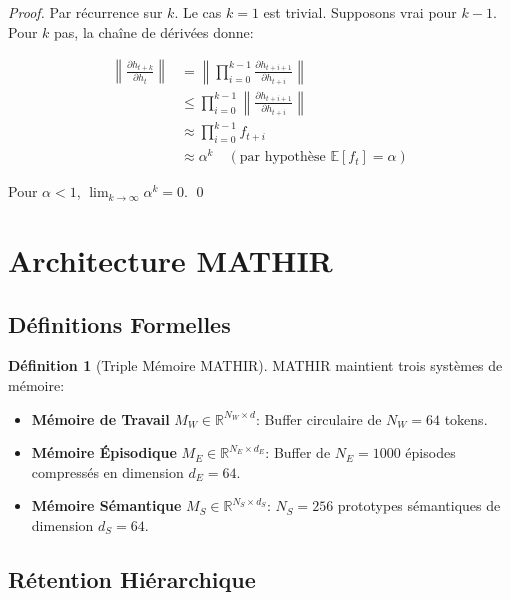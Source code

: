 \documentclass[12pt]{article}
\theoremstyle{definition}
\newtheorem{definition}{Définition}
\begin{document}
\begin{proof}
Par récurrence sur $k$. Le cas $k=1$ est trivial. Supposons vrai pour $k-1$.
Pour $k$ pas, la chaîne de dérivées donne:

\begin{align}
\left\| \frac{\partial h_{t+k}}{\partial h_t} \right\| 
&= \left\| \prod_{i=0}^{k-1} \frac{\partial h_{t+i+1}}{\partial h_{t+i}} \right\| \\
&\leq \prod_{i=0}^{k-1} \left\| \frac{\partial h_{t+i+1}}{\partial h_{t+i}} \right\| \\
&\approx \prod_{i=0}^{k-1} f_{t+i} \\
&\approx \alpha^k \quad (\text{par hypothèse } \mathbb{E}[f_t] = \alpha)
\end{align}

Pour $\alpha < 1$, $\lim_{k \to \infty} \alpha^k = 0$. \qed
\end{proof}

\section{Architecture MATHIR}

\subsection{Définitions Formelles}

\begin{definition}[Triple Mémoire MATHIR]
MATHIR maintient trois systèmes de mémoire:

\begin{itemize}
\item \textbf{Mémoire de Travail} $M_W \in \mathbb{R}^{N_W \times d}$: 
      Buffer circulaire de $N_W = 64$ tokens.
      
\item \textbf{Mémoire Épisodique} $M_E \in \mathbb{R}^{N_E \times d_E}$: 
      Buffer de $N_E = 1000$ épisodes compressés en dimension $d_E = 64$.
      
\item \textbf{Mémoire Sémantique} $M_S \in \mathbb{R}^{N_S \times d_S}$: 
      $N_S = 256$ prototypes sémantiques de dimension $d_S = 64$.
\end{itemize}
\end{definition}

\subsection{Rétention Hiérarchique}
\end{document}
